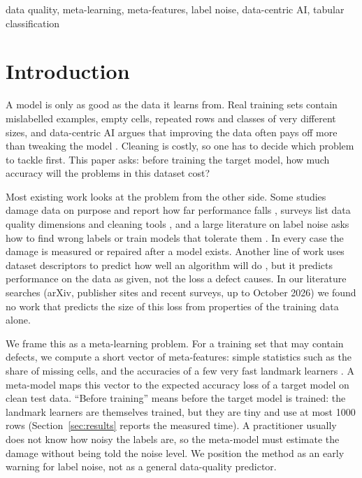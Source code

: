 \documentclass[conference]{IEEEtran}
\begin{document}
\begin{IEEEkeywords}
data quality, meta-learning, meta-features, label noise, data-centric AI, tabular classification
\end{IEEEkeywords}

\section{Introduction}
A model is only as good as the data it learns from. Real training sets contain mislabelled examples, empty cells, repeated rows and classes of very different sizes, and data-centric AI argues that improving the data often pays off more than tweaking the model \cite{zha2025survey,zha2023perspectives,whang2021data}. Cleaning is costly, so one has to decide which problem to tackle first. This paper asks: before training the target model, how much accuracy will the problems in this dataset cost?

Most existing work looks at the problem from the other side. Some studies damage data on purpose and report how far performance falls \cite{mohammed2025effects,maurino2025credit}, surveys list data quality dimensions and cleaning tools \cite{zhou2024dq,cote2023cleaning}, and a large literature on label noise asks how to find wrong labels or train models that tolerate them \cite{frenay2014label,song2023noisy,li2024noisy,northcutt2021confident}. In every case the damage is measured or repaired after a model exists. Another line of work uses dataset descriptors to predict how well an algorithm will do \cite{uddin2024dataset,nabizadeh2026image,garouani2025metalearning}, but it predicts performance on the data as given, not the loss a defect causes. In our literature searches (arXiv, publisher sites and recent surveys, up to October 2026) we found no work that predicts the size of this loss from properties of the training data alone.

We frame this as a meta-learning problem. For a training set that may contain defects, we compute a short vector of meta-features: simple statistics such as the share of missing cells, and the accuracies of a few very fast landmark learners \cite{pfahringer2000landmarking,rivolli2022metafeatures,vanschoren2018metalearning}. A meta-model maps this vector to the expected accuracy loss of a target model on clean test data. ``Before training'' means before the target model is trained: the landmark learners are themselves trained, but they are tiny and use at most 1000 rows (Section~\ref{sec:results} reports the measured time). A practitioner usually does not know how noisy the labels are, so the meta-model must estimate the damage without being told the noise level. We position the method as an early warning for label noise, not as a general data-quality predictor.
\end{document}
